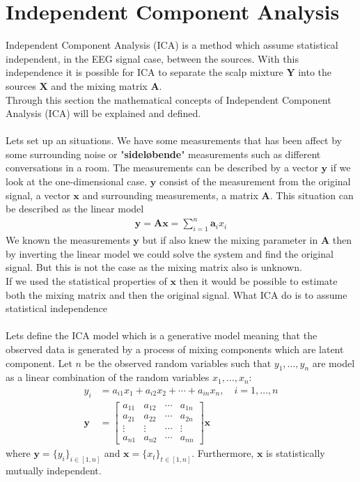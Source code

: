 \section{Independent Component Analysis}\label{sec:ICA}
Independent Component Analysis (ICA) is a method which assume statistical independent, in the EEG signal case, between the sources. With this independence it is possible for ICA to separate the scalp mixture $\mathbf{Y}$ into the sources $\mathbf{X}$ and the mixing matrix $\mathbf{A}$.
\\
Through this section the mathematical concepts of Independent Component Analysis (ICA) will be explained and defined.
\\ \\
Lets set up an situations. We have some measurements that has been affect by some surrounding noise or "\textbf{sideløbende}" measurements such as different conversations in a room. The measurements can be described by a vector $\mathbf{y}$ if we look at the one-dimensional case. $\mathbf{y}$ consist of the measurement from the original signal, a vector $\mathbf{x}$ and surrounding measurements, a matrix $\mathbf{A}$. This situation can be described as the linear model
\begin{align*}
\mathbf{y} = \mathbf{Ax} = \sum_{i=1}^n \mathbf{a}_i x_i
\end{align*}
We known the measurements $\mathbf{y}$ but if also knew the mixing parameter in $\mathbf{A}$ then by inverting the linear model we could solve the system and find the original signal. But this is not the case as the mixing matrix also is unknown.
\\
If we used the statistical properties of $\mathbf{x}$ then it would be possible to estimate both the mixing matrix and then the original signal. What ICA do is to assume statistical independence 
\\ \\
Lets define the ICA model which is a generative model meaning that the observed data is generated by a process of mixing components which are latent component. Let $n$ be the observed random variables such that $y_1, \dots, y_n$ are model as a linear combination of the random variables $x_1, \dots, x_n$:
\begin{align*}
y_i &= a_{i1} x_1 + a_{i2} x_2 + \cdots + a_{in} x_n, \quad i = 1, \dots, n \\
\mathbf{y} &= 
\begin{bmatrix}
a_{11} & a_{12} & \cdots & a_{1n} \\
a_{21} & a_{22} & \cdots & a_{2n} \\
\vdots & \vdots & \cdots & \vdots \\
a_{n1} & a_{n2} & \cdots & a_{nn}
\end{bmatrix}
\mathbf{x}
\end{align*}
where $\mathbf{y} = \{ y_i \}_{i \in [1,n]}$ and $\mathbf{x} = \{ x_t \}_{t \in [1,n]}$. Furthermore, $\mathbf{x}$ is statistically mutually independent.

